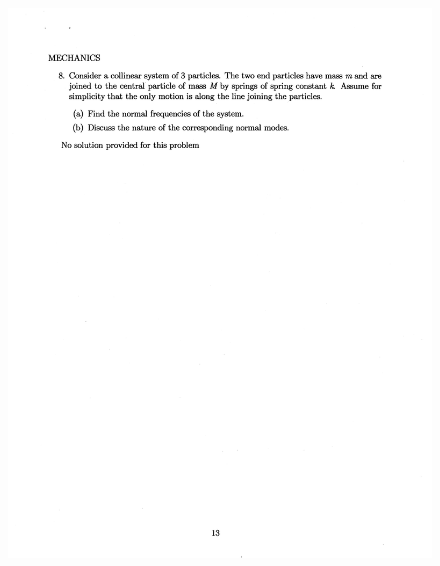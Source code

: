 \documentclass[10pt,a4paper]{article}
\begin{document}
\begin{figure}[H]
 \centering
 \includegraphics[width=16cm]{pdf/1-1T33.png}
\end{figure}
 \newpage
\end{document}
